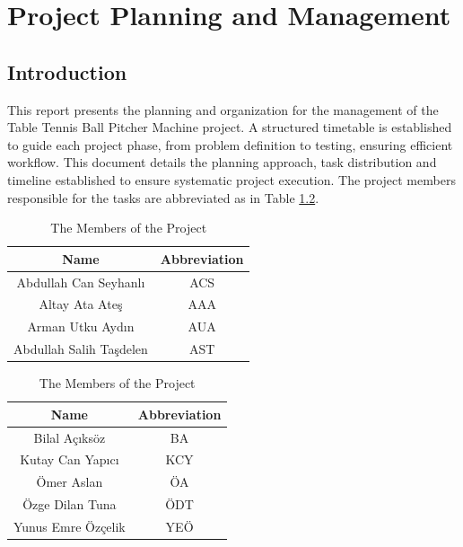 \documentclass[12pt]{report}
\begin{document}
\FloatBarrier


\chapter{Project Planning and Management}
\setcounter{section}{0}
\renewcommand*{\theHsection}{chX.\the\value{section}}


\section{Introduction}
This report presents the planning and organization for the management of the Table Tennis Ball Pitcher Machine project. A structured timetable is established to guide each project phase, from problem definition to testing, ensuring efficient workflow. This document details the planning approach, task distribution and timeline established to ensure systematic project execution. The project members responsible for the tasks are abbreviated as in Table \ref{tab:teammembere}.

\begin{table}[h!]
\centering
\begin{minipage}{0.45\textwidth}
    \centering
    \begin{tabular}{|c|c|}
    \hline
    \textbf{Name} & \textbf{Abbreviation}\\
    \hline
    Abdullah Can Seyhanlı &  ACS\\
    Altay Ata Ateş & AAA\\
    Arman Utku Aydın & AUA\\
    Abdullah Salih Taşdelen &  AST\\
    \hline
    \end{tabular}

\end{minipage}%
\hfill
\begin{minipage}{0.45\textwidth}
    \centering
    \begin{tabular}{|c|c|}
    \hline
    \textbf{Name} & \textbf{Abbreviation} \\
    \hline
    Bilal Açıksöz & BA\\
    Kutay Can Yapıcı & KCY\\
    Ömer Aslan & ÖA\\
    Özge Dilan Tuna & ÖDT\\
    Yunus Emre Özçelik & YEÖ\\
    \hline
    \end{tabular}    
\end{minipage}
    \caption{The Members of the Project}
    \label{tab:teammembere}
\end{table}
\end{document}
